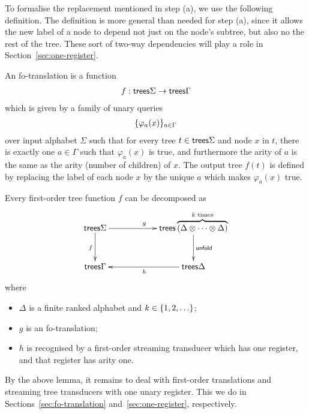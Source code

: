 To formalise the replacement mentioned in step (a), we use the following definition. The definition is more general than needed for step (a), since it allows the new label of a node to depend not just on the node's subtree, but also no the rest of the tree. These sort of two-way dependencies will play a role in Section~\ref{sec:one-register}.


\begin{definition}[Fo translation]
     An fo-translation is a  function
    \begin{align*}
      f :   \mathsf {trees} \Sigma \to \mathsf {trees} \Gamma
    \end{align*}
    which is given by a family of unary queries 
    \begin{align*}
        \{\varphi_a(x)\}_{a \in \Gamma}
    \end{align*}
    over input alphabet $\Sigma$ such that for every tree $t \in \mathsf {trees} \Sigma$ and node $x$ in $t$, there is exactly one $a \in \Gamma$ such that $\varphi_a(x)$ is true, and furthermore the arity of $a$ is the same as the arity (number of children) of $x$.  The output tree $f(t)$ is defined by replacing the label of each node $x$ by the unique $a$ which makes $\varphi_a(x)$ true.
\end{definition}




\begin{lemma}\label{lem:decomposition-of-fo-transductions} Every first-order tree function $f$  can be decomposed as
    \begin{align*}
        \xymatrix@C=2cm{\treesz \Sigma \ar[d]_f \ar[r]^g& \treesz \overbrace{(\Delta \otimes \cdots \otimes \Delta)}^{\text{$k$ times}} \ar[d]^{\mathsf{unfold}} \\   \treesz \Gamma  & \treesz \Delta \ar[l]^h}
    \end{align*}
    where 
    \begin{itemize}
        \item $\Delta$ is a finite ranked alphabet and $k \in \{1,2,\ldots\}$;
        \item $g$ is an fo-translation;
        \item $h$ is recognised by a first-order streaming transducer which has one register, and that register has arity one.
    \end{itemize}
\end{lemma}

By the above lemma, it remains to deal with first-order translations and streaming tree transducers with one unary register. This we do in Sections~\ref{sec:fo-translation} and~\ref{sec:one-register}, respectively.
